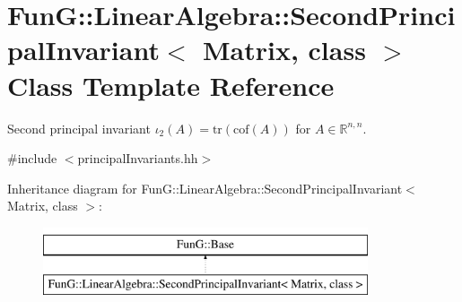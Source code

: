 \hypertarget{classFunG_1_1LinearAlgebra_1_1SecondPrincipalInvariant}{\section{Fun\-G\-:\-:Linear\-Algebra\-:\-:Second\-Principal\-Invariant$<$ Matrix, class $>$ Class Template Reference}
\label{classFunG_1_1LinearAlgebra_1_1SecondPrincipalInvariant}
}


Second principal invariant $ \iota_2(A)=\mathrm{tr}(\mathrm{cof}(A)) $ for $A\in\mathbb{R}^{n,n}$.  




{\ttfamily \#include $<$principal\-Invariants.\-hh$>$}

Inheritance diagram for Fun\-G\-:\-:Linear\-Algebra\-:\-:Second\-Principal\-Invariant$<$ Matrix, class $>$\-:\begin{figure}[H]
\begin{center}
\leavevmode
\includegraphics[height=2.000000cm]{classFunG_1_1LinearAlgebra_1_1SecondPrincipalInvariant}
\end{center}
\end{figure}
